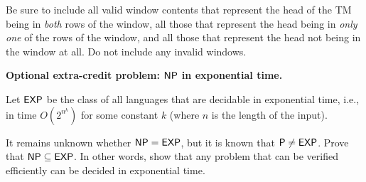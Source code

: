\documentclass[11pt,addpoints]{exam}
\begin{document}
\begin{questions}
  Be sure to include all valid window contents that represent the head of the TM being in \emph{both} rows of the window, all those that represent the head being in \emph{only one} of the rows of the window, and all those that represent the head not being in the window at all.
  Do not include any invalid windows.

  \begin{solution}
   
   \end{solution}

   \bonusquestion[5] \textbf{Optional extra-credit problem: $\textsf{NP}$ in exponential time.}

   Let $\textsf{EXP}$ be the class of all languages that are decidable in exponential time, i.e., in time $O(2^{n^k})$ for some constant $k$ (where $n$ is the length of the input).

   It remains unknown whether $\textsf{NP}=\textsf{EXP}$, but it is known that $\textsf{P} \neq\textsf{EXP}$.
   Prove that $\textsf{NP}\subseteq\textsf{EXP}$.
   In other words, show that any problem that can be verified efficiently can be decided in exponential time.

   \begin{solution}    
     
   \end{solution}

\end{questions}
\end{document}
